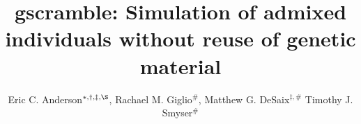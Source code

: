 

\newcommand{\myTitle}{{\sc gscramble:} Simulation of admixed individuals without reuse of genetic material}
\title{\myTitle}

\newcommand{\myAuthors}{Eric C. Anderson$^{*,\dagger,\ddag,\S}$, Rachael M. Giglio$^{\#}$, Matthew G. DeSaix$^{\ddag,\#}$ Timothy J. Smyser$^{\#}$}
\author{Eric C. Anderson$^{*,\dagger,\ddag,\S}$, Rachael M. Giglio$^{\#}$, Matthew G. DeSaix$^{\ddag,\#}$ Timothy J. Smyser$^{\#}$}


\newcommand{\myAffiliations}{$^*$Fisheries Ecology Division,
    Southwest Fisheries Science Center, National Marine Fisheries Service, NOAA,
    110 McAllister Road,
    Santa Cruz, CA 95060, USA.,
    $^\dagger$Dept. of Fish, Wildlife, and Conservation Biology, Colorado State University, Fort Collins, CO, USA,
    $^\ddag$Dept. of Biology, Colorado State University, Fort Collins, CO, USA,
    $^\#$National Wildlife Research Center, United States Department of Agriculture, Wildlife Services,
    Fort Collins, CO, USA
}
\renewcommand{\AuthorAddresses}{\myAffiliations}

\renewcommand{\KeyWords}{genetic stock identification, mixture deconvolution, permutation testing, power analysis, R package}

\renewcommand{\CorrespondingAuthor}{Eric C. Anderson, eric.anderson@noaa.gov}


\newcommand{\myEmailAddress}{eric.anderson@noaa.gov}
\newcommand{\myEmailFootnote}{$^\S$}

\newcommand{\myCopyright}{\copyright US Federal Government work in the public domain in the USA}

\newcommand{\myRunningTitle}{Linkage-aware power assessment for admixture proportions}
\renewcommand{\RunningTitle}{\myRunningTitle}

\newcommand{\myRunningAuthor}{Anderson {\em et al.}}


